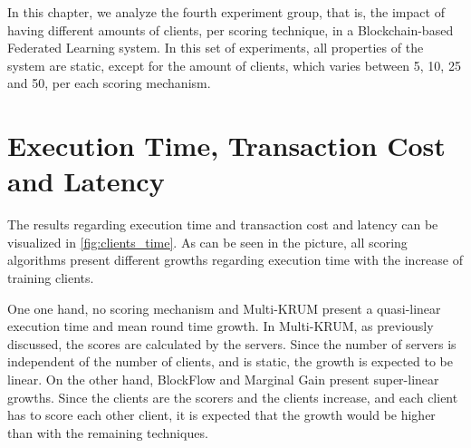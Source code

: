 In this chapter, we analyze the fourth experiment group, that is, the impact of having different amounts of clients, per scoring technique, in a Blockchain-based Federated Learning system. In this set of experiments, all properties of the system are static, except for the amount of clients, which varies between 5, 10, 25 and 50, per each scoring mechanism.

\todo{}

\section{Execution Time, Transaction Cost and Latency}

The results regarding execution time and transaction cost and latency can be visualized in \autoref{fig:clients_time}. As can be seen in the picture, all scoring algorithms present different growths regarding execution time with the increase of training clients.

One one hand, no scoring mechanism and Multi-KRUM present a quasi-linear execution time and mean round time growth. In Multi-KRUM, as previously discussed, the scores are calculated by the servers. Since the number of servers is independent of the number of clients, and is static, the growth is expected to be linear. On the other hand, BlockFlow and Marginal Gain present super-linear growths. Since the clients are the scorers and the clients increase, and each client has to score each other client, it is expected that the growth would be higher than with the remaining techniques.



